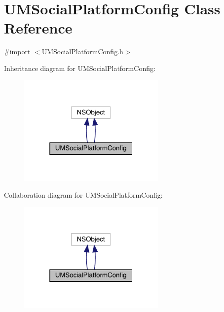 \hypertarget{interface_u_m_social_platform_config}{}\section{U\+M\+Social\+Platform\+Config Class Reference}
\label{interface_u_m_social_platform_config}


{\ttfamily \#import $<$U\+M\+Social\+Platform\+Config.\+h$>$}



Inheritance diagram for U\+M\+Social\+Platform\+Config\+:\nopagebreak
\begin{figure}[H]
\begin{center}
\leavevmode
\includegraphics[width=205pt]{interface_u_m_social_platform_config__inherit__graph}
\end{center}
\end{figure}


Collaboration diagram for U\+M\+Social\+Platform\+Config\+:\nopagebreak
\begin{figure}[H]
\begin{center}
\leavevmode
\includegraphics[width=205pt]{interface_u_m_social_platform_config__coll__graph}
\end{center}
\end{figure}
